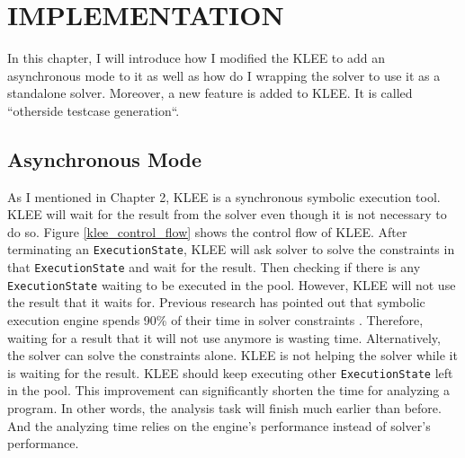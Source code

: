 \chapter{IMPLEMENTATION}%

In this chapter, I will introduce how I modified the KLEE to add an asynchronous mode to it as well as how do I wrapping the solver to use it as a standalone solver. Moreover, a new feature is added to KLEE. It is called ``otherside testcase generation``.

\section{Asynchronous Mode}
As I mentioned in Chapter 2, KLEE is a synchronous symbolic execution tool. KLEE will wait for the result from the solver even though it is not necessary to do so. Figure \ref{klee_control_flow} shows the control flow of KLEE. After terminating an \texttt{ExecutionState}, KLEE will ask solver to solve the constraints in that \texttt{ExecutionState} and wait for the result. Then checking if there is any \texttt{ExecutionState} waiting to be executed in the pool. However, KLEE will not use the result that it waits for. Previous research has pointed out that symbolic execution engine spends 90\% of their time in solver constraints \cite{Rakadjiev:2015:PSS:2847598.2847727}. Therefore, waiting for a result that it will not use anymore is wasting time. Alternatively, the solver can solve the constraints alone. KLEE is not helping the solver while it is waiting for the result. KLEE should keep executing other \texttt{ExecutionState} left in the pool. This improvement can significantly shorten the time for analyzing a program. In other words, the analysis task will finish much earlier than before. And the analyzing time relies on the engine's performance instead of solver's performance. 

